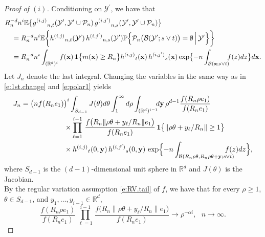 \documentclass[11pt]{amsart}
\numberwithin{equation}{section}
\theoremstyle{plain}
\theoremstyle{definition}
\begin{document}
\begin{proof}[Proof of $(i)$]
Conditioning on ${{\mathcal{Y}^{\prime}}}$, we have that
\begin{align*}
&R_n^{-d} n^i {\mathbb{E}} \bigl\{ {g^{(i,j)}}_{n,t}({{\mathcal{Y}^{\prime}}}, {{\mathcal{Y}^{\prime}}} \cup {\mathcal P_n})\, {g^{(i,j^{\prime})}}_{n,s}({{\mathcal{Y}^{\prime}}}, {{\mathcal{Y}^{\prime}}} \cup {\mathcal P_n}) \bigr\} \\
&\quad = R_n^{-d} n^i {\mathbb{E}} \biggl\{ {h^{(i,j)}}_{n,t}({{\mathcal{Y}^{\prime}}})\, {h^{(i,{j^{\prime}})}}_{n,s}({{\mathcal{Y}^{\prime}}}) {\mathbb{P}} \Bigl\{ {\mathcal P_n} \bigl( {\mathcal B} ({{\mathcal{Y}^{\prime}}}; s \vee t) \bigr) = \emptyset \, \Bigl|\,  {{\mathcal{Y}^{\prime}}} \Bigr\} \biggr\}    \\
&\quad = R_n^{-d} n^i \int_{({{\mathbb R}}^d)^i} f({{\bf x}})\, {{\bf 1}} \bigl\{ m({{\bf x}}) \geq R_n \bigr\} {h^{(i,j)}}_t({{\bf x}})\, {h^{(i,{j^{\prime}})}}_s({{\bf x}}) \exp \bigl\{-n\int_{{\mathcal B}({{\bf x}}; s \vee t)} \hspace{-5pt} f(z)dz\bigr\}   d{{\bf x}}.
\end{align*}
Let $J_n$ denote the last integral. Changing the variables in the same way as in \eqref{e:1st.change} and \eqref{e:polar1} yields
\begin{align}
J_n &= \bigl(nf(R_ne_1)  \bigr)^i \int_{S_{d-1}} J(\theta) d\theta \int_1^{\infty} d\rho \int_{({{\mathbb R}}^d)^{i-1}} \hspace{-5pt} d{{\bf y}} \, \rho^{d-1} \frac{f(R_n\rho e_1)}{f(R_ne_1)}  \label{e:polar2} \\
&\qquad \qquad \qquad \times \prod_{\ell = 1}^{i-1}\, \frac{f \bigl( R_n \| \rho \theta + y_\ell /R_n \|e_1 \bigr)}{f(R_ne_1)}\, {{\bf 1}} \bigl\{ \| \rho \theta + y_\ell /R_n \| \geq 1 \bigr\} \notag \\
&\qquad \qquad \qquad \times {h^{(i,j)}}_t(0,{{\bf y}})\, {h^{(i,{j^{\prime}})}}_s(0,{{\bf y}})\, \exp \Bigl\{ -n \int_{{\mathcal B}(R_n\rho \theta,R_n\rho \theta + {{\bf y}}; s\vee t )} \hspace{-15pt} f(z)dz \Bigr\}, \notag
\end{align}
where $S_{d-1}$ is the $(d-1)$-dimensional unit sphere  in ${{\mathbb R}}^d$ and $J(\theta)$ is the Jacobian. \\
By the regular variation assumption \eqref{e:RV.tail} of $f$, we have that for every $\rho \geq 1$, $\theta \in S_{d-1}$, and $y_1,\dots, y_{i-1} \in {{\mathbb R}}^d$,
$$
\frac{f(R_n\rho e_1)}{f(R_ne_1)}\, \prod_{\ell = 1}^{i-1}\, \frac{f \bigl( R_n \| \rho \theta + y_\ell /R_n \|e_1 \bigr)}{f(R_ne_1)} \to \rho^{-\alpha i}, \ \ \ n\to\infty.
$$
\end{proof}
\end{document}
